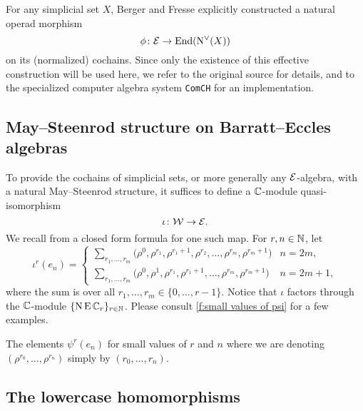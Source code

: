 For any simplicial set $X$, Berger and Fresse explicitly constructed a natural operad morphism
\[
\phi \colon \mathcal{E} \to \mathrm{End}(\operatorname{N^{\vee}}(X))
\]
on its (normalized) cochains.
Since only the existence of this effective construction will be used here, we refer to the original source for details, and to the specialized computer algebra system \texttt{ComCH} for an implementation.

\subsection{May--Steenrod structure on Barratt--Eccles algebras}

To provide the cochains of simplicial sets, or more generally any $\mathcal{E}$-algebra, with a natural May--Steenrod structure, it suffices to define a $\mathbb{C}$-module quasi-isomorphism
\[
\iota \colon \mathcal{W} \to \mathcal{E}.
\]
We recall from \cite{medina2021may_st} a closed form formula for one such map.
For $r,n\in\mathbb{N}$, let
\begin{equation*}
	\iota^{r}(e_{n}) = \begin{cases}
		\displaystyle{\sum_{r_1, \dots, r_m}} \big(\rho^0, \rho^{r_1}, \rho^{r_1+1}, \rho^{r_2}, \dots, \rho^{r_{m}}, \rho^{r_{m}+1} \big) & n = 2m, \\
		\displaystyle{\sum_{r_1, \dots, r_m}} \big(\rho^0, \rho^1, \rho^{r_1}, \rho^{r_1+1}, \dots, \rho^{r_{m}}, \rho^{r_{m}+1} \big) & n = 2m+1,
	\end{cases}
\end{equation*}
where the sum is over all $r_1, \dots, r_m \in \{0, \dots, r-1\}$.
Notice that $\iota$ factors through the $\mathbb{C}$-module $\{\operatorname{N}\operatorname{E}\mathbb{C}_r\}_{r\in\mathbb{N}}$.
Please consult \cref{f:small values of psi} for a few examples.

\begin{table}
	\centering
	
	\caption{The elements $\psi^r(e_n)$ for small values of $r$ and $n$ where we are denoting $(\rho^{r_0}, \dots, \rho^{r_n})$ simply by $(r_0, \dots, r_n)$.}
	\label{f:small values of psi}
\end{table}

\subsection{The lowercase homomorphisms}

